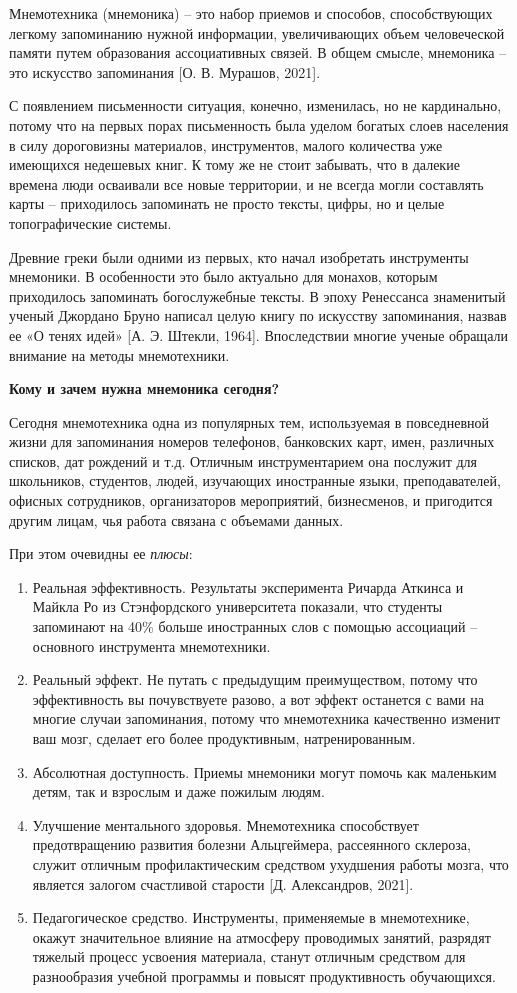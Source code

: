 Мнемотехника (мнемоника) – это набор приемов и способов, способствующих легкому запоминанию нужной информации, увеличивающих объем человеческой памяти путем образования ассоциативных связей. В общем смысле, мнемоника – это искусство запоминания [О. В. Мурашов, 2021].

С появлением письменности ситуация, конечно, изменилась, но не кардинально, потому что на первых порах письменность была уделом богатых слоев населения в силу дороговизны материалов, инструментов, малого количества уже имеющихся недешевых книг. К тому же не стоит забывать, что в далекие времена люди осваивали все новые территории, и не всегда могли составлять карты – приходилось запоминать не просто тексты, цифры, но и целые топографические системы.

Древние греки были одними из первых, кто начал изобретать инструменты мнемоники. В особенности это было актуально для монахов, которым приходилось запоминать богослужебные тексты. В эпоху Ренессанса знаменитый ученый Джордано Бруно написал целую книгу по искусству запоминания, назвав ее «О тенях идей» [А. Э. Штекли, 1964]. Впоследствии многие ученые обращали внимание на методы мнемотехники.

\textbf{Кому и зачем нужна мнемоника сегодня?}

Сегодня мнемотехника одна из популярных тем, используемая в повседневной жизни для запоминания номеров телефонов, банковских карт, имен, различных списков, дат рождений и т.д. Отличным инструментарием она послужит для школьников, студентов, людей, изучающих иностранные языки, преподавателей, офисных сотрудников, организаторов мероприятий, бизнесменов, и пригодится другим лицам, чья работа связана с объемами данных.

При этом очевидны ее \textit{плюсы}:
%
\begin{enumerate}
    \item Реальная эффективность. Результаты эксперимента Ричарда Аткинса и Майкла Ро из Стэнфордского университета показали, что студенты запоминают на 40\% больше иностранных слов с помощью ассоциаций – основного инструмента мнемотехники.
    \item Реальный эффект. Не путать с предыдущим преимуществом, потому что эффективность вы почувствуете разово, а вот эффект останется с вами на многие случаи запоминания, потому что мнемотехника качественно изменит ваш мозг, сделает его более продуктивным, натренированным.
    \item Абсолютная доступность. Приемы мнемоники могут помочь как маленьким детям, так и взрослым и даже пожилым людям.
    \item Улучшение ментального здоровья. Мнемотехника способствует предотвращению развития болезни Альцгеймера, рассеянного склероза, служит отличным профилактическим средством ухудшения работы мозга, что является залогом счастливой старости [Д. Александров, 2021].
    \item Педагогическое средство. Инструменты, применяемые в мнемотехнике, окажут значительное влияние на атмосферу проводимых занятий, разрядят тяжелый процесс усвоения материала, станут отличным средством для разнообразия учебной программы и повысят продуктивность обучающихся.
\end{enumerate}

